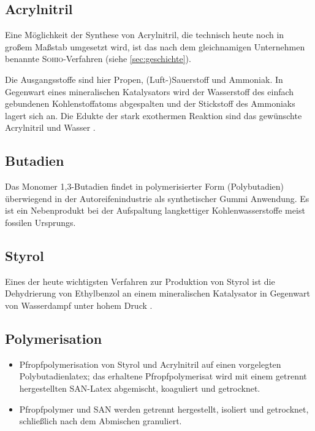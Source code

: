         \subsection{Acrylnitril}
            Eine Möglichkeit der Synthese von Acrylnitril, die technisch heute noch in großem Maßstab umgesetzt wird, ist das nach dem gleichnamigen
            Unternehmen benannte \textsc{Sohio}-Verfahren (siehe \cref{sec:geschichte}).

            Die Ausgangsstoffe sind hier Propen, (Luft-)Sauerstoff und Ammoniak. In Gegenwart eines mineralischen Katalysators wird der Wasserstoff
            des einfach gebundenen Kohlenstoffatoms abgespalten und der Stickstoff des Ammoniaks lagert sich an. Die Edukte der
            stark exothermen Reaktion sind das gewünschte Acrylnitril und Wasser \cite{sohio.process.patent.1959.9201957}.
        \subsection{Butadien}
            Das Monomer 1,3-Butadien findet in polymerisierter Form (Polybutadien) überwiegend in der Autoreifenindustrie als synthetischer Gummi
            Anwendung. Es ist ein Nebenprodukt bei der Aufspaltung langkettiger Kohlenwasserstoffe meist fossilen Ursprungs.
        \subsection{Styrol}
            Eines der heute wichtigsten Verfahren zur Produktion von Styrol ist die Dehydrierung von Ethylbenzol
            an einem mineralischen Katalysator in Gegenwart von Wasserdampf unter hohem Druck \cite{styrol.synthese.Liquid.Phase.Alkylation.of.Benzene.Bellussi.1995}.
        \subsection{Polymerisation}
            \begin{itemize}
                \item Pfropfpolymerisation von Styrol und Acrylnitril auf einen vorgelegten Polybutadienlatex; das erhaltene Pfropfpolymerisat
                wird mit einem getrennt hergestellten SAN-Latex abgemischt, koaguliert und getrocknet. \cite{Domininghaus.1998.Kunststoffe.und.ihre.Eigenschaften,Eyerer.2020.Polymer.Engineering.1}
                \item Pfropfpolymer und SAN werden getrennt hergestellt, isoliert und getrocknet, schließlich nach dem Abmischen granuliert. \cite{Domininghaus.1998.Kunststoffe.und.ihre.Eigenschaften,Eyerer.2020.Polymer.Engineering.1}
            \end{itemize}
